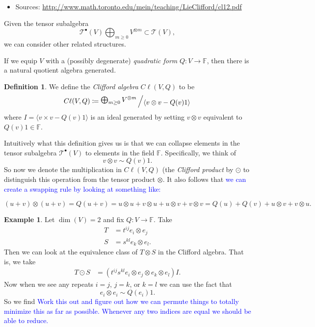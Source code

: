 \documentclass[12pt]{article}
\newcommand{\field}{\mathbb{F}}
\newcommand{\bigslant}[2]{{\raisebox{.2em}{$#1$}\left/\raisebox{-.2em}{$#2$}\right.}}
\newcommand{\clifford}{C\ell(V,Q)}
\theoremstyle{definition}
\newtheorem{definition}{Definition}[section]
\newtheorem{example}{Example}[section]
\begin{document}
\begin{itemize}
    \item Sources: \url{http://www.math.toronto.edu/mein/teaching/LieClifford/cl12.pdf}
\end{itemize}
Given the tensor subalgebra 
\[
\mathcal{T}^\bullet(V)\bigoplus_{m\geq 0} V^{\otimes m} \subset \mathcal{T}(V),
\]
we can consider other related structures.

If we equip $V$ with a (possibly degenerate) \emph{quadratic form} $Q \colon V \to \field$, then there is a natural quotient algebra generated.

\begin{definition}
We define the \emph{Clifford algebra} $\clifford$ to be 
\[
\clifford \coloneqq \bigslant{\bigoplus_{m\geq 0} V^{\otimes m}}{\langle v\otimes v - Q(v)1\rangle}
\]
where $I=\langle v\times v - Q(v)1\rangle$ is an  ideal generated by setting $v\otimes v$ equivalent to $Q(v)1 \in \field$. 
\end{definition}

Intuitively what this definition gives us is that we can collapse elements in the tensor subalgebra $\mathcal{T}^\bullet(V)$ to elements in the field $\field$. Specifically, we think of 
\[
v\otimes v \sim Q(v)1.
\]
So now we denote the multiplication in $\clifford$ (the \emph{Clifford product} by $\odot$ to distinguish this operation from the tensor product $\otimes$.  It also follows that \textcolor{blue}{we can create a swapping rule by looking at something like:}

\[
(u+v)\otimes (u+v) = Q(u+v)=u\otimes u + v \otimes u + u \otimes v + v\otimes v = Q(u)+Q(v) + u\otimes v + v\otimes u.
\]

\begin{example}
Let $\dim(V)=2$ and fix $Q\colon V \to \field$. Take
\begin{align*}
T&=t^{ij}e_i \otimes e_j\\
S&=s^{kl}e_k\otimes e_l.
\end{align*}
Then we can look at the equivalence class of $T\otimes S$ in the Clifford algebra.  That is, we take
\begin{align*}
T\odot S &= (t^{ij}s^{kl} e_i \otimes e_j \otimes e_k \otimes e_l) I.
\end{align*}
Now when we see any repeats $i=j$, $j=k$, or $k=l$ we can use the fact that
\[
e_i \otimes e_i \sim Q(e_i)1.
\]
So we find
\textcolor{blue}{Work this out and figure out how we can permute things to totally minimize this as far as possible. Whenever any two indices are equal we should be able to reduce.}
\end{example}
\end{document}
